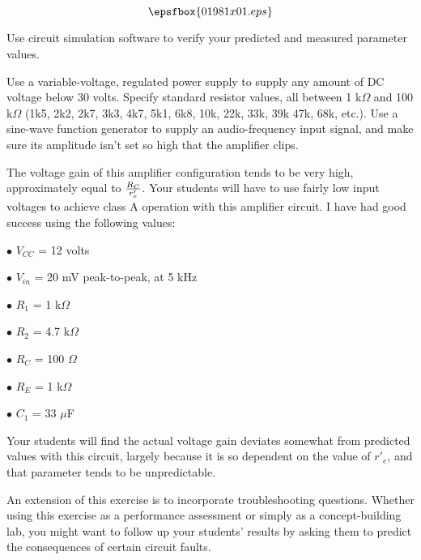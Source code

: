 

$$\epsfbox{01981x01.eps}$$

\vfil \eject






Use circuit simulation software to verify your predicted and measured parameter values.







Use a variable-voltage, regulated power supply to supply any amount of DC voltage below 30 volts.  Specify standard resistor values, all between 1 k$\Omega$ and 100 k$\Omega$ (1k5, 2k2, 2k7, 3k3, 4k7, 5k1, 6k8, 10k, 22k, 33k, 39k 47k, 68k, etc.).  Use a sine-wave function generator to supply an audio-frequency input signal, and make sure its amplitude isn't set so high that the amplifier clips.

The voltage gain of this amplifier configuration tends to be very high, approximately equal to $R_C \over r'_e$.  Your students will have to use fairly low input voltages to achieve class A operation with this amplifier circuit.  I have had good success using the following values:

\medskip
\item{$\bullet$} $V_{CC}$ = 12 volts
\item{$\bullet$} $V_{in}$ = 20 mV peak-to-peak, at 5 kHz
\item{$\bullet$} $R_1$ = 1 k$\Omega$
\item{$\bullet$} $R_2$ = 4.7 k$\Omega$
\item{$\bullet$} $R_C$ = 100 $\Omega$
\item{$\bullet$} $R_E$ = 1 k$\Omega$
\item{$\bullet$} $C_1$ = 33 $\mu$F
\medskip

Your students will find the actual voltage gain deviates somewhat from predicted values with this circuit, largely because it is so dependent on the value of $r'_e$, and that parameter tends to be unpredictable.

An extension of this exercise is to incorporate troubleshooting questions.  Whether using this exercise as a performance assessment or simply as a concept-building lab, you might want to follow up your students' results by asking them to predict the consequences of certain circuit faults.




